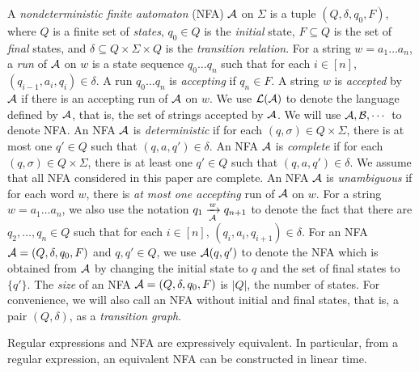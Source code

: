 A \emph{nondeterministic finite automaton} (NFA) $\mathcal{A}$ on $\Sigma$ is a tuple $(Q, \delta, q_0, F)$, where $Q$ is a finite set of \emph{states}, $q_0 \in Q$ is the \emph{initial} state, $F \subseteq Q$ is the set of \emph{final} states, and $\delta \subseteq Q \times \Sigma \times Q$ is the \emph{transition relation}. For a string $w = a_1 \dots a_n$, a \emph{run} of $\mathcal{A}$ on $w$ is a state sequence $q_0 \dots q_n$ such that for each $i \in [n]$, $(q_{i-1}, a_i, q_i) \in \delta$. A run $q_0 \dots q_n$ is \emph{accepting} if $q_n \in F$. A string $w$ is \emph{accepted} by $\mathcal{A}$ if there is an accepting run of $\mathcal{A}$ on $w$. We use $\mathcal{L}(\mathcal{A})$ to denote the language defined by $\mathcal{A}$, that is, the set of strings accepted by $\mathcal{A}$. We will use $\mathcal{A}, \mathcal{B}, \cdots$ to denote NFA. An NFA $\mathcal{A}$ is \emph{deterministic} if for each $(q, \sigma) \in Q \times \Sigma$, there is at most one $q' \in Q$ such that $(q, a, q') \in \delta$. An NFA $\mathcal{A}$ is \emph{complete} if for each $(q, \sigma) \in Q \times \Sigma$, there is at least one $q' \in Q$ such that $(q, a, q') \in \delta$. We assume that all NFA considered in this paper are complete.  An NFA $\mathcal{A}$ is \emph{unambiguous} if for each word $w$, there is \emph{at most one accepting} run of $\mathcal{A}$ on $w$.
For a string $w= a_1 \dots a_n$, we also use the notation $q_1 \xrightarrow[\mathcal{A}]{w} q_{n+1}$ to denote the fact that there are $q_2,\dots, q_n \in Q$ such that for each $i \in [n]$, $(q_i, a_i, q_{i+1}) \in \delta$.  For an NFA $\mathcal{A}=(Q, \delta, q_0, F)$ and $q, q' \in Q$, we use $\mathcal{A}(q,q')$ to denote the NFA which is obtained from $\mathcal{A}$ by changing the initial state to $q$ and the set of final states to $\{q'\}$. The \emph{size} of an NFA $\mathcal{A}=(Q, \delta, q_0, F)$ is $|Q|$, the number of states. For convenience, we will also call an NFA without initial and final states, that is, a pair $(Q, \delta)$, as a \emph{transition graph}.

\begin{proposition}[\cite{HU79}]
Regular expressions and NFA are expressively equivalent. In particular, from a regular expression, an equivalent NFA can be constructed in linear time.
\end{proposition}

